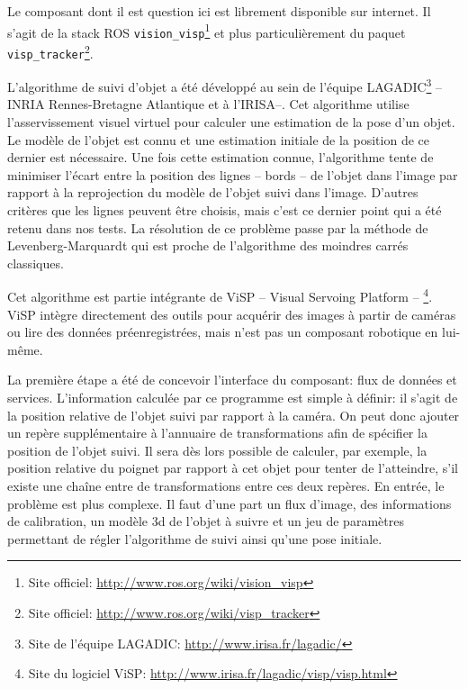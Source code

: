 Le composant dont il est question ici est librement disponible sur
internet. Il s'agit de la stack ROS
\texttt{vision\_visp}\footnote{Site officiel:
  \url{http://www.ros.org/wiki/vision_visp}} et plus particulièrement
du paquet \texttt{visp\_tracker}\footnote{Site officiel:
  \url{http://www.ros.org/wiki/visp_tracker}}.


L'algorithme de suivi d'objet a été développé au sein de l'équipe
LAGADIC\footnote{Site de l'équipe LAGADIC:
  \url{http://www.irisa.fr/lagadic/}} -- INRIA Rennes-Bretagne
Atlantique et à l'IRISA--. Cet algorithme utilise l'asservissement
visuel virtuel pour calculer une estimation de la pose d'un objet. Le
modèle de l'objet est connu et une estimation initiale de la position
de ce dernier est nécessaire. Une fois cette estimation connue,
l'algorithme tente de minimiser l'écart entre la position des lignes
-- bords -- de l'objet dans l'image par rapport à la reprojection du
modèle de l'objet suivi dans l'image. D'autres critères que les lignes
peuvent être choisis, mais c'est ce dernier point qui a été retenu
dans nos tests. La résolution de ce problème passe par la méthode de
Levenberg-Marquardt qui est proche de
l'algorithme des moindres carrés classiques.


Cet algorithme est partie intégrante de ViSP -- Visual Servoing
Platform -- \footnote{Site du logiciel ViSP:
  \url{http://www.irisa.fr/lagadic/visp/visp.html}}. ViSP intègre
directement des outils pour acquérir des images à partir de caméras ou
lire des données préenregistrées, mais n'est pas un composant
robotique en lui-même.


La première étape a été de concevoir l'interface du composant: flux de données
et services. L'information calculée par ce programme est simple à
définir: il s'agit de la position relative de l'objet suivi par
rapport à la caméra. On peut donc ajouter un repère supplémentaire à
l'annuaire de transformations afin de spécifier la position de l'objet
suivi. Il sera dès lors possible de calculer, par exemple, la position
relative du poignet par rapport à cet objet pour tenter de
l'atteindre, s'il existe une chaîne entre de transformations entre ces
deux repères. En entrée, le problème est plus complexe. Il faut d'une
part un flux d'image, des informations de calibration, un modèle 3d de
l'objet à suivre et un jeu de paramètres permettant de régler
l'algorithme de suivi ainsi qu'une pose initiale.

